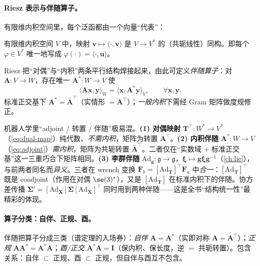 \paragraph{Riesz 表示与伴随算子。}
有限维内积空间里，每个泛函都由一个向量“代表”：

\begin{theorem}\label{thm:riesz}
有限维内积空间 $V$ 中，映射 $\mathbf{v}\mapsto\langle\cdot,\mathbf{v}\rangle$ 是 $V\to V^*$ 的（共轭线性）同构。即每个 $\varphi\in V^*$ 唯一地写成 $\varphi(\cdot)=\langle\cdot,\mathbf{u}\rangle$。
\end{theorem}

\noindent Riesz 把“对偶”与“内积”两条平行结构焊接起来，由此可定义\emph{伴随算子}：对 $\mathbf{A}:V\to W$，存在唯一 $\mathbf{A}^*:W\to V$ 使
\begin{equation}
  \langle\mathbf{A}\mathbf{x},\mathbf{y}\rangle_W=\langle\mathbf{x},\mathbf{A}^*\mathbf{y}\rangle_V,\qquad\forall\mathbf{x},\mathbf{y}.
  \label{eq:adjoint}
\end{equation}
标准正交基下 $\mathbf{A}^*=\bar{\mathbf{A}}^\top$（实情形 $=\mathbf{A}^\top$）；\emph{一般内积}下需经 Gram 矩阵做度规修正。

\begin{pitfall}
机器人学里“adjoint / 转置 / 伴随”极易混。\textbf{(1) 对偶映射} $\mathbf{T}^\top:W^*\to V^*$（\cref{eq:dual-map}）纯代数、\emph{不需内积}，矩阵为转置 $\mathbf{A}^\top$。\textbf{(2) 内积伴随} $\mathbf{A}^*:W\to V$（\cref{eq:adjoint}）\emph{需内积}，矩阵为共轭转置 $\bar{\mathbf{A}}^\top$。二者仅在“实数域 $+$ 标准正交基”这一三重巧合下矩阵相同。\textbf{(3) 李群伴随} $\mathrm{Ad}_{\mathbf{g}}:\mathfrak{g}\to\mathfrak{g}$，$\boldsymbol{\xi}\mapsto\mathbf{g}\boldsymbol{\xi}\mathbf{g}^{-1}$（\cref{ch:lie}），与前两者同名而\emph{异义}。三者在 wrench 变换 $\mathbf{F}_b=[\mathrm{Ad}_{\mathbf{T}}]^\top\mathbf{F}_a$ 中\emph{合一}：$[\mathrm{Ad}_{\mathbf{T}}]^\top$ 既是 coadjoint（作用在对偶 $\se(3)^*$），又是 $[\mathrm{Ad}_{\mathbf{T}}]$ 在标准内积下的伴随。协方差传播 $\boldsymbol{\Sigma}'=[\mathrm{Ad}_{\mathbf{X}}]\boldsymbol{\Sigma}[\mathrm{Ad}_{\mathbf{X}}]^\top$ 同时用到两种伴随——这是全书“结构统一性”最精彩的体现。
\end{pitfall}

\paragraph{算子分类：自伴、正规、酉。}
伴随把算子分成三类（谱定理的入场券）：\emph{自伴} $\mathbf{A}=\mathbf{A}^*$（实即对称 $\mathbf{A}=\mathbf{A}^\top$）；\emph{正规} $\mathbf{A}\mathbf{A}^*=\mathbf{A}^*\mathbf{A}$；\emph{酉/正交} $\mathbf{A}^*\mathbf{A}=\mathbf{I}$（保内积、保长度，逆 $=$ 共轭转置）。包含关系：自伴 $\subset$ 正规、酉 $\subset$ 正规，但自伴与酉互不包含。

